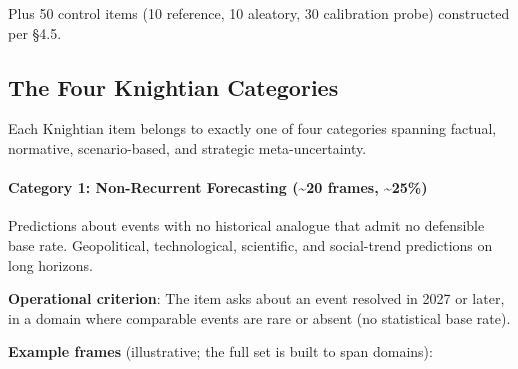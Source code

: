 \documentclass{article}
\begin{document}
Plus 50 control items (10 reference, 10 aleatory, 30 calibration probe)
constructed per \S{}4.5.

\subsection{The Four Knightian
Categories}\label{the-four-knightian-categories}

Each Knightian item belongs to exactly one of four categories spanning
factual, normative, scenario-based, and strategic meta-uncertainty.

\paragraph{Category 1: Non-Recurrent Forecasting (\textasciitilde20
frames,
\textasciitilde25\%)}\label{category-1-non-recurrent-forecasting-20-frames-25}

Predictions about events with no historical analogue that admit no
defensible base rate. Geopolitical, technological, scientific, and
social-trend predictions on long horizons.

\textbf{Operational criterion}: The item asks about an event resolved in
2027 or later, in a domain where comparable events are rare or absent
(no statistical base rate).

\textbf{Example frames} (illustrative; the full set is built to span
domains):
\end{document}
